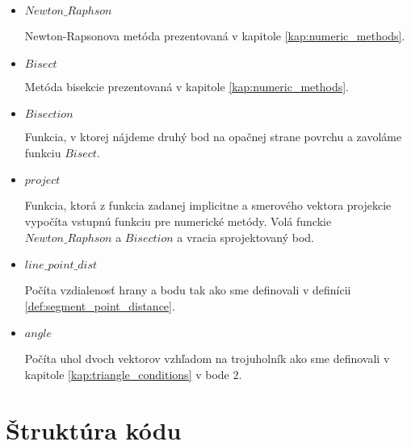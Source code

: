         \begin{itemize}
            \item{
                $Newton\_Raphson$

                Newton-Rapsonova metóda prezentovaná v kapitole \ref{kap:numeric_methods}.
            }
            \item{
                $Bisect$

                Metóda bisekcie prezentovaná v kapitole \ref{kap:numeric_methods}.
            }
            \item{
                $Bisection$

                Funkcia, v ktorej nájdeme druhý bod na opačnej strane povrchu a zavoláme
                funkciu $Bisect$.
            }
            \item{
                $project$

                Funkcia, ktorá z funkcia zadanej implicitne a smerového vektora projekcie
                vypočíta vstupnú funkciu pre numerické metódy. Volá funckie $Newton\_Raphson$
                a $Bisection$ a vracia sprojektovaný bod.
            }
            \item{
                $line\_point\_dist$

                Počíta vzdialenosť hrany a bodu tak ako sme definovali v definícii 
                \ref{def:segment_point_distance}.
            }
            \item{
                $angle$

                Počíta uhol dvoch vektorov vzhľadom na trojuholník ako sme definovali v kapitole 
                \ref{kap:triangle_conditions} v bode $2$.
            }
        \end{itemize}
\section{Štruktúra kódu}

